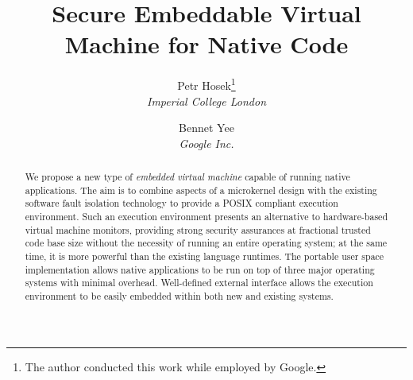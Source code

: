 \documentclass[twocolumn,10pt]{article}
\begin{document}
\title{\bf Secure Embeddable Virtual Machine for Native Code}
\author{
Petr Hosek\footnote{The author conducted this work while employed by
Google.}\\\textit{Imperial College London}
\and Bennet Yee\\\textit{Google Inc.}
}
\date{}
\maketitle
\thispagestyle{empty}

\begin{abstract}
  We propose a new type of \emph{embedded virtual machine} capable of
  running native applications. The aim is to combine aspects of a
  microkernel design with the existing software fault isolation
  technology to provide a POSIX compliant execution environment. Such an
  execution environment presents an alternative to hardware-based
  virtual machine monitors, providing strong security assurances at
  fractional trusted code base size without the necessity of running an
  entire operating system; at the same time, it is more powerful than
  the existing language runtimes.  The portable user space
  implementation allows native applications to be run on top of three
  major operating systems with minimal overhead.  Well-defined external
  interface allows the execution environment to be easily embedded
  within both new and existing systems.




\end{abstract}








{
  
  
}
\end{document}
